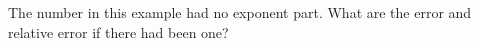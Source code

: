 The number in this example had no exponent part. What are the error
and relative error if there had been one?
